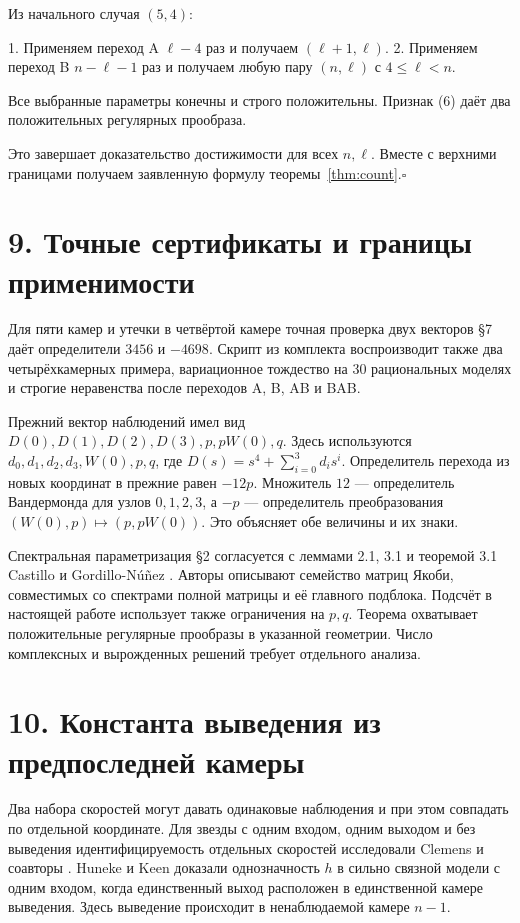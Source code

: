 \documentclass[11pt,a4paper]{article}
\begin{document}
Из начального случая \((5,4)\):

1. Применяем переход A \(\ell-4\) раз и получаем \((\ell+1,\ell)\).
2. Применяем переход B \(n-\ell-1\) раз и получаем любую пару \((n,\ell)\) с \(4\le\ell<n\).

Все выбранные параметры конечны и строго положительны. Признак (6) даёт два положительных регулярных прообраза.

Это завершает доказательство достижимости для всех \(n,\ell\). Вместе с верхними границами получаем заявленную формулу теоремы~\ref{thm:count}.\hfill\(\square\)

\section*{\color{ink} 9. Точные сертификаты и границы применимости}

Для пяти камер и утечки в четвёртой камере точная проверка двух векторов §7 даёт определители \(3456\) и \(-4698\). Скрипт из комплекта воспроизводит также два четырёхкамерных примера, вариационное тождество на 30 рациональных моделях и строгие неравенства после переходов A, B, AB и BAB.

Прежний вектор наблюдений имел вид \(D(0),D(1),D(2),D(3),p,pW(0),q\). Здесь используются \(d_0,d_1,d_2,d_3,W(0),p,q\), где \(D(s)=s^4+\sum_{i=0}^3d_i s^i\). Определитель перехода из новых координат в прежние равен \(-12p\). Множитель \(12\) — определитель Вандермонда для узлов \(0,1,2,3\), а \(-p\) — определитель преобразования \((W(0),p)\mapsto(p,pW(0))\). Это объясняет обе величины и их знаки.

Спектральная параметризация §2 согласуется с леммами 2.1, 3.1 и теоремой 3.1 Castillo и Gordillo-Núñez \cite{ref4}. Авторы описывают семейство матриц Якоби, совместимых со спектрами полной матрицы и её главного подблока. Подсчёт в настоящей работе использует также ограничения на \(p,q\). Теорема охватывает положительные регулярные прообразы в указанной геометрии. Число комплексных и вырожденных решений требует отдельного анализа.

\section*{\color{ink} 10. Константа выведения из предпоследней камеры}
Два набора скоростей могут давать одинаковые наблюдения и при этом совпадать по отдельной координате. Для звезды с одним входом, одним выходом и без выведения идентифицируемость отдельных скоростей исследовали Clemens и соавторы \cite[теорема~3.2, §4]{ref5}. Huneke и Keen \cite[предложение~4.5]{ref6} доказали однозначность \(h\) в сильно связной модели с одним входом, когда единственный выход расположен в единственной камере выведения. Здесь выведение происходит в ненаблюдаемой камере \(n-1\).
\end{document}
